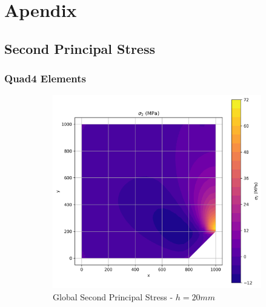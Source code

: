 \section{Apendix}

\subsection{Second Principal Stress}

\subsubsection{Quad4 Elements}

\begin{figure}[H]
  \centering
  \begin{subfigure}[b]{0.45\textwidth}
    \centering
    \includegraphics[width=\textwidth]{GRAFICOS/Quad4/2mm_global/resultados - sigma_2.png}
    \caption{Global Second Principal Stress - $h=20mm$}
    \label{fig:img1}
  \end{subfigure}
  \hfill
  \begin{subfigure}[b]{0.45\textwidth}
    \centering

\end{subfigure}
\end{figure}

